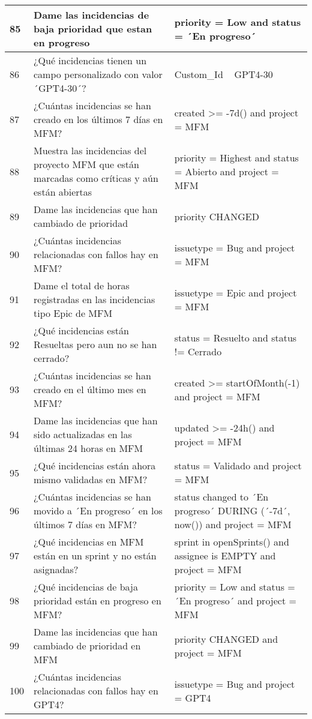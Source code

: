 \begin{center}
\begin{longtable}{ | p{1cm} | p{8cm} | p{6cm} | }
        \hline
        85 & Dame las incidencias de baja prioridad que estan en progreso & priority = Low and status = ´En progreso´ \\
        \hline
        86 & ¿Qué incidencias tienen un campo personalizado con valor ´GPT4-30´? & Custom\_Id ~ GPT4-30 \\
        \hline
        87 & ¿Cuántas incidencias se han creado en los últimos 7 días en MFM? & created >= -7d() and project = MFM \\
        \hline
        88 & Muestra las incidencias del proyecto MFM que están marcadas como críticas y aún están abiertas & priority = Highest and status = Abierto and project = MFM \\
        \hline
        89 & Dame las incidencias que han cambiado de prioridad & priority CHANGED \\
        \hline
        90 & ¿Cuántas incidencias relacionadas con fallos hay en MFM? & issuetype = Bug and project = MFM \\
        \hline
        91 & Dame el total de horas registradas en las incidencias tipo Epic de MFM & issuetype = Epic and project = MFM \\
        \hline
        92 & ¿Qué incidencias están Resueltas pero aun no se han cerrado? & status = Resuelto and status != Cerrado \\
        \hline
        93 & ¿Cuántas incidencias se han creado en el último mes en MFM? & created >= startOfMonth(-1) and project = MFM \\
        \hline
        94 & Dame las incidencias que han sido actualizadas en las últimas 24 horas en MFM & updated >= -24h() and project = MFM \\
        \hline
        95 & ¿Qué incidencias están ahora mismo validadas en MFM? & status = Validado and project = MFM \\
        \hline
        96 & ¿Cuántas incidencias se han movido a ´En progreso´ en los últimos 7 días en MFM? & status changed to ´En progreso´ DURING (´-7d´, now()) and project = MFM \\
        \hline
        97 & ¿Qué incidencias en MFM están en un sprint y no están asignadas? & sprint in openSprints() and assignee is EMPTY and project = MFM \\
        \hline
        98 & ¿Qué incidencias de baja prioridad están en progreso en MFM? & priority = Low and status = ´En progreso´ and project = MFM \\
        \hline
        99 & Dame las incidencias que han cambiado de prioridad en MFM & priority CHANGED and project = MFM \\
        \hline
        100 & ¿Cuántas incidencias relacionadas con fallos hay en GPT4? & issuetype = Bug and project = GPT4 \\
        \hline
        
    \end{longtable}
        
\end{center}